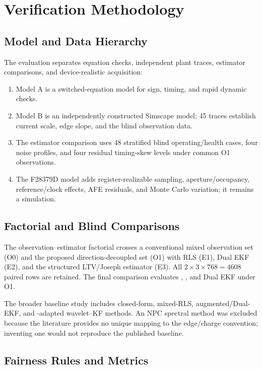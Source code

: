 \section{Verification Methodology}
\label{sec:protocol}

\subsection{Model and Data Hierarchy}

The evaluation separates equation checks, independent plant traces, estimator comparisons, and device-realistic acquisition:
\begin{enumerate}
\item Model A is a switched-equation \Cuk{} model for sign, timing, and rapid dynamic checks.
\item Model B is an independently constructed Simscape model; 45 traces establish current scale, edge slope, and the blind observation data.
\item The estimator comparison uses 48 stratified blind operating/health cases, four noise profiles, and four residual timing-skew levels under common O1 observations.
\item The F28379D model adds register-realizable sampling, aperture/occupancy, reference/clock effects, AFE residuals, and Monte Carlo variation; it remains a simulation.
\end{enumerate}

\subsection{Factorial and Blind Comparisons}

The observation--estimator factorial crosses a conventional mixed observation set (O0) and the proposed direction-decoupled set (O1) with RLS (E1), Dual EKF (E2), and the structured LTV/Joseph estimator (E3). All $2\times3\times768=4608$ paired rows are retained. The final comparison evaluates \TSRLS{}, \TSKF{}, and Dual EKF under O1.

The broader baseline study includes closed-form, mixed-RLS, augmented/Dual-EKF, and \Cuk{}-adapted wavelet--KF methods. An NPC spectral method was excluded because the literature provides no unique mapping to the \Cuk{} edge/charge convention; inventing one would not reproduce the published baseline.

\subsection{Fairness Rules and Metrics}

